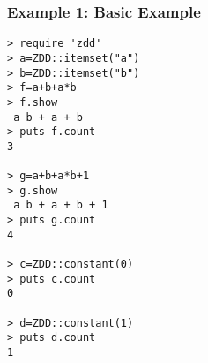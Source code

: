\subsubsection*{Example 1: Basic Example}



\begin{Verbatim}[baselinestretch=0.7,frame=single]
> require 'zdd'
> a=ZDD::itemset("a")
> b=ZDD::itemset("b")
> f=a+b+a*b
> f.show
 a b + a + b
> puts f.count
3

> g=a+b+a*b+1
> g.show
 a b + a + b + 1
> puts g.count
4

> c=ZDD::constant(0)
> puts c.count
0

> d=ZDD::constant(1)
> puts d.count
1
\end{Verbatim}
